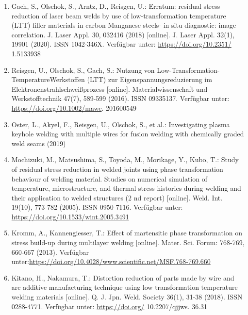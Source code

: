 \documentclass[10pt]{article}
\begin{document}
\begin{enumerate}
  \item Gach, S., Olschok, S., Arntz, D., Reisgen, U.: Erratum: residual stress reduction of laser beam welds by use of low-transformation temperature (LTT) filler materials in carbon Manganese steels- in situ diagnostic: image correlation. J. Laser Appl. 30, 032416 (2018) [online]. J. Laser Appl. 32(1), 19901 (2020). ISSN 1042-346X. Verfügbar unter: \href{https://doi.org/10.2351/}{https://doi.org/10.2351/} 1.5133938

  \item Reisgen, U., Olschok, S., Gach, S.: Nutzung von Low-Transformation-TemperatureWerkstoffen (LTT) zur Eigenspannungsreduzierung im Elektronenstrahlschweißprozess [online]. Materialwissenschaft und Werkstofftechnik 47(7), 589-599 (2016). ISSN 09335137. Verfügbar unter: \href{https://doi.org/10.1002/mawe}{https://doi.org/10.1002/mawe}. 201600549

  \item Oster, L., Akyel, F., Reisgen, U., Olschok, S., et al.: Investigating plasma keyhole welding with multiple wires for fusion welding with chemically graded weld seams (2019)

  \item Mochizuki, M., Matsushima, S., Toyoda, M., Morikage, Y., Kubo, T.: Study of residual stress reduction in welded joints using phase transformation behaviour of welding material. Studies on numerical simulation of temperature, microstructure, and thermal stress histories during welding and their application to welded structures (2 nd report) [online]. Weld. Int. 19(10), 773-782 (2005). ISSN 0950-7116. Verfügbar unter: \href{https://doi.org/10.1533/wint.2005.3491}{https://doi.org/10.1533/wint.2005.3491}

  \item Kromm, A., Kannengiesser, T.: Effect of martensitic phase transformation on stress build-up during multilayer welding [online]. Mater. Sci. Forum: 768-769, 660-667 (2013). Verfügbar unter:\href{https://doi.org/10.4028/www.scientific.net/MSF.768-769.660}{https://doi.org/10.4028/www.scientific.net/MSF.768-769.660}

  \item Kitano, H., Nakamura, T.: Distortion reduction of parts made by wire and arc additive manufacturing technique using low transformation temperature welding materials [online]. Q. J. Jpn. Weld. Society 36(1), 31-38 (2018). ISSN 0288-4771. Verfügbar unter: \href{https://doi.org/}{https://doi.org/} 10.2207/qjjws. 36.31

\end{enumerate}
\end{document}
